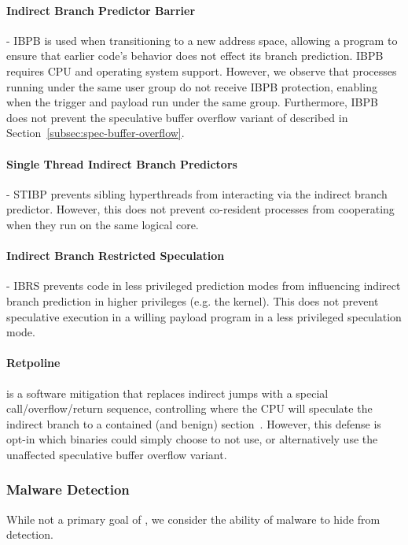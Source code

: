 \paragraph{Indirect Branch Predictor Barrier} - IBPB is used when transitioning to a new
address space, allowing a
program to ensure that earlier code's behavior does not effect its branch prediction.
IBPB requires CPU and operating system support. However, we observe that
processes running under the same user group do not receive IBPB protection,
enabling \speculake when the trigger and payload run under the same group.
Furthermore, IBPB does not prevent the speculative buffer overflow variant of
\speculake described in Section~\ref{subsec:spec-buffer-overflow}.


\paragraph{Single Thread Indirect Branch Predictors} - STIBP prevents sibling
hyperthreads from interacting via the indirect branch predictor. However, this
does not prevent co-resident processes from cooperating when they run on the same
logical core.

\paragraph{Indirect Branch Restricted Speculation} - IBRS prevents code in less
privileged prediction modes from influencing indirect branch prediction in
higher privileges (e.g. the kernel). This does not
prevent speculative execution in a willing payload program in a less privileged
speculation mode.

\paragraph{Retpoline} is a software mitigation that replaces indirect jumps with
a special call/overflow/return sequence, controlling where the CPU will
speculate the indirect branch to a contained (and benign)
section~\cite{retpoline}. However, this defense is opt-in which \speculake
binaries could simply choose to not use, or alternatively use the unaffected
speculative buffer overflow variant.

\subsubsection{Malware Detection}
\label{subsubsec:malware}
While not a primary goal of \speculake, we consider the ability of \speculake
malware to hide from detection.

